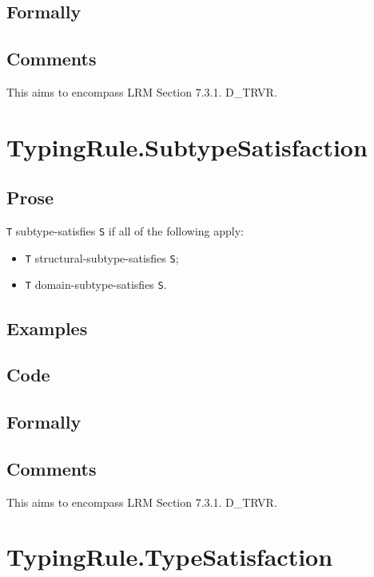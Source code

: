 \documentclass{book}
\begin{document}
  \subsection{Formally}

  \subsection{Comments}
    This aims to encompass LRM Section 7.3.1. D\_TRVR.

\section{TypingRule.SubtypeSatisfaction}

  \subsection{Prose}
    \texttt{T} subtype-satisfies \texttt{S} if all of the following apply:
    \begin{itemize}
    \item \texttt{T} structural-subtype-satisfies \texttt{S};
    \item \texttt{T} domain-subtype-satisfies \texttt{S}.
    \end{itemize} 

  \subsection{Examples}

  \subsection{Code}

  \subsection{Formally}

  \subsection{Comments}
    This aims to encompass LRM Section 7.3.1. D\_TRVR.

\section{TypingRule.TypeSatisfaction \label{sec:TypingRule.TypeSatisfaction}}
\end{document}
